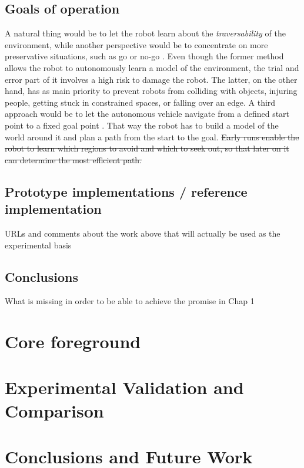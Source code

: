 \documentclass[12pt,a4paper]{report}
\newcommand{\term}{\textit}
\begin{document}
	\section{Goals of operation}
	\label{sec:bg:goals}
	
	A natural thing would be to let the robot learn about the \term{traversability} 
	of the environment, while another perspective would be to concentrate on more 
	preservative situations, such as go or no-go \cite{Hirose}. Even though the 
	former method allows the robot to autonomously learn a model of the environment, 
	the trial and error part of it involves a high risk to damage the robot. The 
	latter, on the other hand, has as main priority to prevent robots from 
	colliding with objects, injuring people, getting stuck in constrained spaces, 
	or falling over an edge. A third approach would be to let the autonomous vehicle 
	navigate from a defined start point to a fixed goal	point \cite{Shneier}. That 
	way the robot has to build a model of the world around it and plan a path from 
	the start to the goal. 
	\sout{Early runs enable the robot to learn which regions to 
	avoid and which to seek out, so that later on it can determine the most efficient 
	path.}
	\\
	
	\section{Prototype implementations / reference implementation}
	\label{sec:bg:code}
	
	URLs and comments about the work above that will actually be used as 
	the experimental basis
	\\
		
	\section{Conclusions}
	\label{sec:bg:concl}
	
	What is missing in order to be able to achieve the promise in Chap 1
	
	
	\chapter{Core foreground}
	\label{sec:fg}
	
	\chapter{Experimental Validation and Comparison}
	\label{sec:exp}
	
	\chapter{Conclusions and Future Work}
	\label{sec:concl}
	
	\renewcommand{\bibname}{References}
	
	
\end{document}
